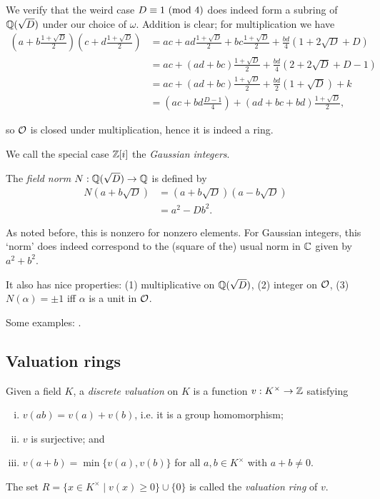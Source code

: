 We verify that the weird case $D\equiv 1 \ (\mathrm{mod}\ 4)$ does indeed form a subring of $\mathbb{Q}(\sqrt{D})$ under our choice of $\omega$. Addition is clear; for multiplication we have
\begin{align*}
	\left(a+b\frac{1+\sqrt{D}}{2}\right)\left(c+d\frac{1+\sqrt{D}}{2}\right) &= ac+ad\frac{1+\sqrt{D}}{2} + bc\frac{1+\sqrt{D}}{2} + \frac{bd}{4}(1 + 2\sqrt{D} + D)\\
	&= ac + (ad+bc)\frac{1+\sqrt{D}}{2} + \frac{bd}{4}(2 + 2\sqrt{D} + D - 1)\\
	&= ac + (ad+bc)\frac{1+\sqrt{D}}{2} + \frac{bd}{2}(1+\sqrt{D}) + k\\
	&= (ac + bd\frac{D-1}{4}) + (ad + bc + bd)\frac{1+\sqrt{D}}{2},
\end{align*}

so $\mathcal{O}$ is closed under multiplication, hence it is indeed a ring.

We call the special case $\mathbb{Z}[i]$ the \emph{Gaussian integers}.

\begin{definition}
	The \emph{field norm} $N:\mathbb{Q}(\sqrt{D})\to\mathbb{Q}$ is defined by
	\begin{align*}
		N(a+b\sqrt{D}) &= (a+b\sqrt{D})(a-b\sqrt{D})\\
			&= a^2-Db^2.
	\end{align*}
\end{definition}

As noted before, this is nonzero for nonzero elements. For Gaussian integers, this `norm' does indeed correspond to the (square of the) usual norm in $\mathbb{C}$ given by $a^2+b^2$.

It also has nice properties: (1) multiplicative on $\mathbb{Q}(\sqrt{D})$, (2) integer on $\mathcal{O}$, (3) $N(\alpha)=\pm 1$ iff $\alpha$ is a unit in $\mathcal{O}$. 

Some examples: .




\subsection{Valuation rings}

\begin{definition}
	Given a field $K$, a \emph{discrete valuation} on $K$ is a function $v:K^\times\to\mathbb{Z}$ satisfying
	\begin{enumerate}[(i)]
		\item $v(ab) = v(a)+v(b)$, i.e. it is a group homomorphism;
		\item $v$ is surjective; and
		\item $v(a+b) = \min\{v(a), v(b)\}$ for all $a,b\in K^\times$ with $a+b\neq 0$.
	\end{enumerate}

	The set $R = \{x\in K^\times \mid v(x)\geq 0\}\cup\{0\}$ is called the \emph{valuation ring} of $v$.
\end{definition}

